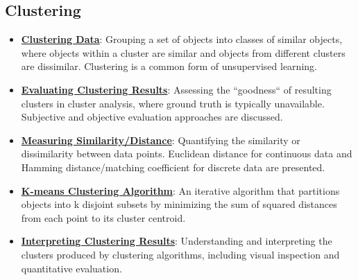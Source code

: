 \documentclass{article}%
\begin{document}
%
\subsection{Clustering}%
\label{subsec:Clustering}%
\begin{itemize}[leftmargin=*]%
\item \href{https://purdue.brightspace.com/d2l/common/assets/pdfjs-d2l-dist/1.0.14-legacy/web/viewer.html?file=\%2Fcontent\%2Fenforced\%2F1095467-wl.202510.CS.24300.001\%2F12L2-distance-clusters.pdf\%3Fou\%3D1095467\&lang=en-us\&container=d2l-fileviewer-rendered-pdf\&fullscreen=d2l-fileviewer-rendered-pdf-dialog\&height=667#page=4}{\textbf{Clustering Data}}: Grouping a set of objects into classes of similar objects, where objects within a cluster are similar and objects from different clusters are dissimilar. Clustering is a common form of unsupervised learning.%
\item \href{https://purdue.brightspace.com/d2l/common/assets/pdfjs-d2l-dist/1.0.14-legacy/web/viewer.html?file=\%2Fcontent\%2Fenforced\%2F1095467-wl.202510.CS.24300.001\%2F12L2-distance-clusters.pdf\%3Fou\%3D1095467\&lang=en-us\&container=d2l-fileviewer-rendered-pdf\&fullscreen=d2l-fileviewer-rendered-pdf-dialog\&height=667#page=37}{\textbf{Evaluating Clustering Results}}: Assessing the ``goodness`` of resulting clusters in cluster analysis, where ground truth is typically unavailable. Subjective and objective evaluation approaches are discussed.%
\item \href{https://purdue.brightspace.com/d2l/common/assets/pdfjs-d2l-dist/1.0.14-legacy/web/viewer.html?file=\%2Fcontent\%2Fenforced\%2F1095467-wl.202510.CS.24300.001\%2F12L2-distance-clusters.pdf\%3Fou\%3D1095467\&lang=en-us\&container=d2l-fileviewer-rendered-pdf\&fullscreen=d2l-fileviewer-rendered-pdf-dialog\&height=667#page=17}{\textbf{Measuring Similarity/Distance}}: Quantifying the similarity or dissimilarity between data points. Euclidean distance for continuous data and Hamming distance/matching coefficient for discrete data are presented.%
\item \href{https://purdue.brightspace.com/d2l/common/assets/pdfjs-d2l-dist/1.0.14-legacy/web/viewer.html?file=\%2Fcontent\%2Fenforced\%2F1095467-wl.202510.CS.24300.001\%2F12L2-distance-clusters.pdf\%3Fou\%3D1095467\&lang=en-us\&container=d2l-fileviewer-rendered-pdf\&fullscreen=d2l-fileviewer-rendered-pdf-dialog\&height=667#page=21}{\textbf{K-means Clustering Algorithm}}: An iterative algorithm that partitions objects into k disjoint subsets by minimizing the sum of squared distances from each point to its cluster centroid.%
\item \href{https://purdue.brightspace.com/d2l/common/assets/pdfjs-d2l-dist/1.0.14-legacy/web/viewer.html?file=\%2Fcontent\%2Fenforced\%2F1095467-wl.202510.CS.24300.001\%2F12L2-distance-clusters.pdf\%3Fou\%3D1095467\&lang=en-us\&container=d2l-fileviewer-rendered-pdf\&fullscreen=d2l-fileviewer-rendered-pdf-dialog\&height=667#page=36}{\textbf{Interpreting Clustering Results}}: Understanding and interpreting the clusters produced by clustering algorithms, including visual inspection and quantitative evaluation.%
\end{itemize}
\end{document}
